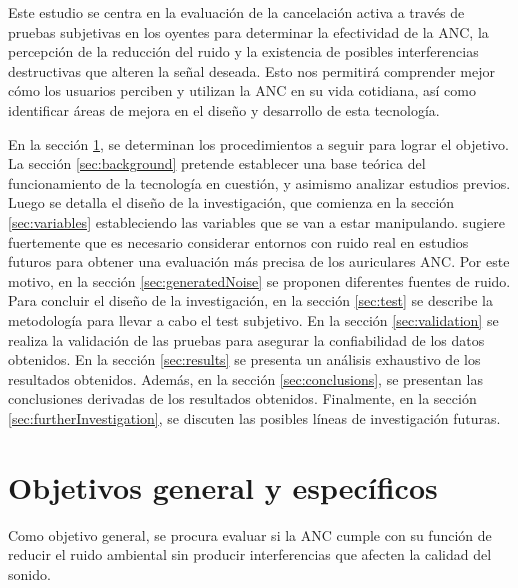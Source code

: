 \documentclass[a4paper,12pt]{article}
\begin{document}
Este estudio se centra en la evaluación de la cancelación activa a través de pruebas subjetivas en los oyentes para determinar la efectividad de la ANC, la percepción de la reducción del ruido y la existencia de posibles interferencias destructivas que alteren la señal deseada.
Esto nos permitirá comprender mejor cómo los usuarios perciben y utilizan la ANC en su vida cotidiana, así como identificar áreas de mejora en el diseño y desarrollo de esta tecnología.

En la sección \ref{sec:objectives}, se determinan los procedimientos a seguir para lograr el objetivo.
La sección \ref{sec:background} pretende establecer una base teórica del funcionamiento de la tecnología en cuestión, y asimismo analizar estudios previos.
Luego se detalla el diseño de la investigación, que comienza en la sección \ref{sec:variables} estableciendo las variables que se van a estar manipulando.
\textcite{Ang2017} sugiere fuertemente que es necesario considerar entornos con ruido real en estudios futuros para obtener una evaluación más precisa de los auriculares ANC.
Por este motivo, en la sección \ref{sec:generatedNoise} se proponen diferentes fuentes de ruido.
Para concluir el diseño de la investigación, en la sección \ref{sec:test} se describe la metodología para llevar a cabo el test subjetivo.
En la sección \ref{sec:validation} se realiza la validación de las pruebas para asegurar la confiabilidad de los datos obtenidos.
En la sección \ref{sec:results} se presenta un análisis exhaustivo de los resultados obtenidos.
Además, en la sección \ref{sec:conclusions}, se presentan las conclusiones derivadas de los resultados obtenidos.
Finalmente, en la sección \ref{sec:furtherInvestigation}, se discuten las posibles líneas de investigación futuras.

\section{Objetivos general y específicos}
\label{sec:objectives}

Como objetivo general, se procura evaluar si la ANC cumple con su función de reducir el ruido ambiental sin producir interferencias que afecten la calidad del sonido.

\end{document}
